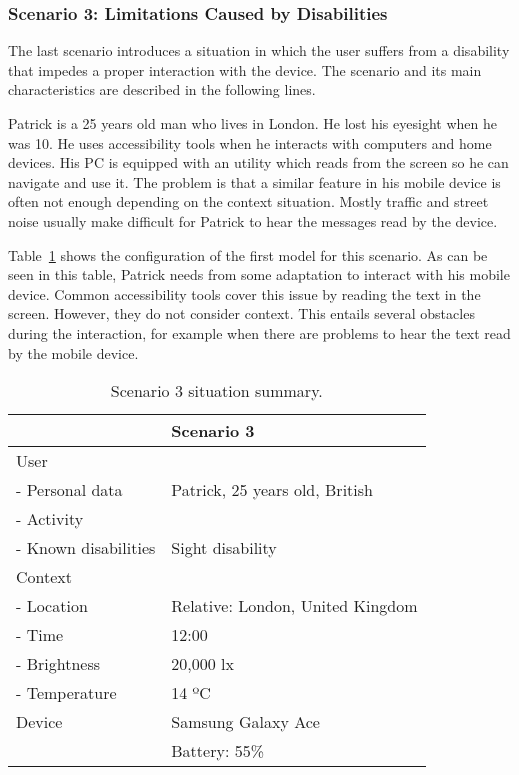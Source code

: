 \subsubsection{Scenario 3: Limitations Caused by Disabilities}
\label{sec:scenario3}

The last scenario introduces a situation in which the user suffers from a 
disability that impedes a proper interaction with the device. The scenario and 
its main characteristics are described in the following lines.

Patrick is a 25 years old man who lives in London. He lost his eyesight when he
was 10. He uses accessibility tools when he interacts with computers and home
devices. His PC is equipped with an utility which reads from the screen so he
can navigate and use it. The problem is that a similar feature in his mobile
device is often not enough depending on the context situation. Mostly traffic
and street noise usually make difficult for Patrick to hear the messages read by
the device.

Table~\ref{tbl:scenario3} shows the configuration of the first model for this
scenario. As can be seen in this table, Patrick needs from some adaptation to
interact with his mobile device. Common accessibility tools cover this issue by
reading the text in the screen. However, they do not consider context. This
entails several obstacles during the interaction, for example when there are
problems to hear the text read by the mobile device.

\begin{table}
 \caption{Scenario 3 situation summary.}
 \label{tbl:scenario3}
 \footnotesize
 \centering
\begin{tabular}{l l}
  \hline 
				& \textbf{Scenario 3}		\\
  \hline
  User \\
  \qquad - Personal data 	& Patrick, 25 years old, British\\
  \qquad - Activity	 	& 				\\
  \qquad - Known disabilities 	& Sight disability		\\
  Context \\
  \qquad - Location 		& Relative: London, United Kingdom\\
  \qquad - Time			& 12:00			\\
  \qquad - Brightness		& 20,000 \ac{lx}		\\
  \qquad - Temperature		& 14 ºC			\\
  Device 			& Samsung Galaxy Ace		\\
				&  Battery: 55\%		\\	
  \hline
\end{tabular}
\end{table}

